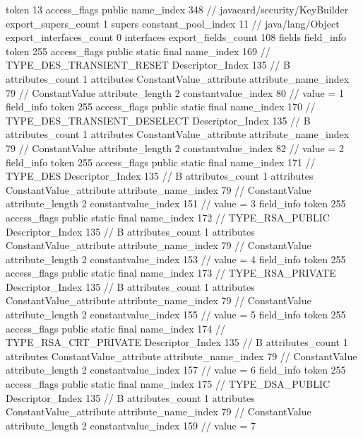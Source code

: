 {{{			token	13
			access_flags	public
			name_index	348		// javacard/security/KeyBuilder
			export_supers_count	1
			supers {
				constant_pool_index	11		// java/lang/Object
			}
			export_interfaces_count	0
			interfaces {
			}
			export_fields_count	108
			fields {
			field_info {
				token	255
				access_flags	public static final
				name_index	169		// TYPE_DES_TRANSIENT_RESET
				Descriptor_Index	135		// B
				attributes_count	1
				attributes {
				ConstantValue_attribute {
					attribute_name_index	79		// ConstantValue
					attribute_length	2
					constantvalue_index	80		// value = 1
				}
				}
			}
			field_info {
				token	255
				access_flags	public static final
				name_index	170		// TYPE_DES_TRANSIENT_DESELECT
				Descriptor_Index	135		// B
				attributes_count	1
				attributes {
				ConstantValue_attribute {
					attribute_name_index	79		// ConstantValue
					attribute_length	2
					constantvalue_index	82		// value = 2
				}
				}
			}
			field_info {
				token	255
				access_flags	public static final
				name_index	171		// TYPE_DES
				Descriptor_Index	135		// B
				attributes_count	1
				attributes {
				ConstantValue_attribute {
					attribute_name_index	79		// ConstantValue
					attribute_length	2
					constantvalue_index	151		// value = 3
				}
				}
			}
			field_info {
				token	255
				access_flags	public static final
				name_index	172		// TYPE_RSA_PUBLIC
				Descriptor_Index	135		// B
				attributes_count	1
				attributes {
				ConstantValue_attribute {
					attribute_name_index	79		// ConstantValue
					attribute_length	2
					constantvalue_index	153		// value = 4
				}
				}
			}
			field_info {
				token	255
				access_flags	public static final
				name_index	173		// TYPE_RSA_PRIVATE
				Descriptor_Index	135		// B
				attributes_count	1
				attributes {
				ConstantValue_attribute {
					attribute_name_index	79		// ConstantValue
					attribute_length	2
					constantvalue_index	155		// value = 5
				}
				}
			}
			field_info {
				token	255
				access_flags	public static final
				name_index	174		// TYPE_RSA_CRT_PRIVATE
				Descriptor_Index	135		// B
				attributes_count	1
				attributes {
				ConstantValue_attribute {
					attribute_name_index	79		// ConstantValue
					attribute_length	2
					constantvalue_index	157		// value = 6
				}
				}
			}
			field_info {
				token	255
				access_flags	public static final
				name_index	175		// TYPE_DSA_PUBLIC
				Descriptor_Index	135		// B
				attributes_count	1
				attributes {
				ConstantValue_attribute {
					attribute_name_index	79		// ConstantValue
					attribute_length	2
					constantvalue_index	159		// value = 7
}}}}}}}
